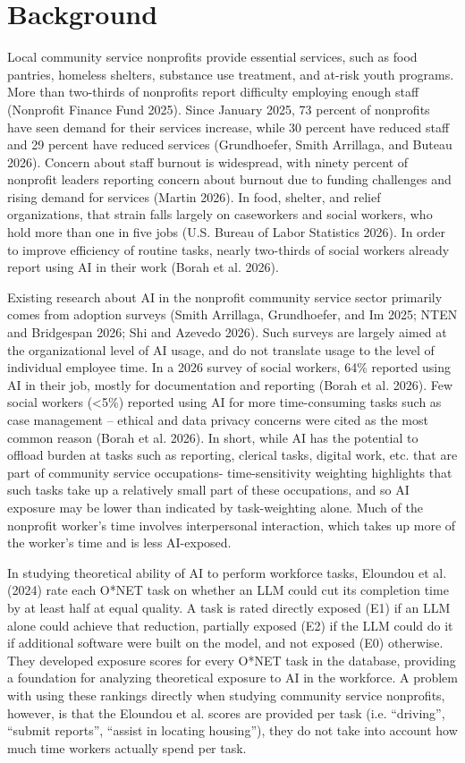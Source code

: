 \section{Background}

Local community service nonprofits provide essential services, such as food pantries, homeless shelters, substance use treatment, and at-risk youth programs. More than two-thirds of nonprofits report difficulty employing enough staff (Nonprofit Finance Fund 2025). Since January 2025, 73 percent of nonprofits have seen demand for their services increase, while 30 percent have reduced staff and 29 percent have reduced services (Grundhoefer, Smith Arrillaga, and Buteau 2026). Concern about staff burnout is widespread, with ninety percent of nonprofit leaders reporting concern about burnout due to funding challenges and rising demand for services (Martin 2026). In food, shelter, and relief organizations, that strain falls largely on caseworkers and social workers, who hold more than one in five jobs (U.S. Bureau of Labor Statistics 2026). In order to improve efficiency of routine tasks, nearly two-thirds of social workers already report using AI in their work (Borah et al. 2026).

Existing research about AI in the nonprofit community service sector primarily comes from adoption surveys (Smith Arrillaga, Grundhoefer, and Im 2025; NTEN and Bridgespan 2026; Shi and Azevedo 2026). Such surveys are largely aimed at the organizational level of AI usage, and do not translate usage to the level of individual employee time. In a 2026 survey of social workers, 64\% reported using AI in their job, mostly for documentation and reporting (Borah et al. 2026). Few social workers (\textless5\%) reported using AI for more time-consuming tasks such as case management -- ethical and data privacy concerns were cited as the most common reason (Borah et al. 2026). In short, while AI has the potential to offload burden at tasks such as reporting, clerical tasks, digital work, etc. that are part of community service occupations- time-sensitivity weighting highlights that such tasks take up a relatively small part of these occupations, and so AI exposure may be lower than indicated by task-weighting alone. Much of the nonprofit worker's time involves interpersonal interaction, which takes up more of the worker's time and is less AI-exposed.

In studying theoretical ability of AI to perform workforce tasks, Eloundou et al. (2024) rate each O*NET task on whether an LLM could cut its completion time by at least half at equal quality. A task is rated directly exposed (E1) if an LLM alone could achieve that reduction, partially exposed (E2) if the LLM could do it if additional software were built on the model, and not exposed (E0) otherwise. They developed exposure scores for every O*NET task in the database, providing a foundation for analyzing theoretical exposure to AI in the workforce. A problem with using these rankings directly when studying community service nonprofits, however, is that the Eloundou et al. scores are provided per task (i.e. ``driving'', ``submit reports'', ``assist in locating housing''), they do not take into account how much time workers actually spend per task.

